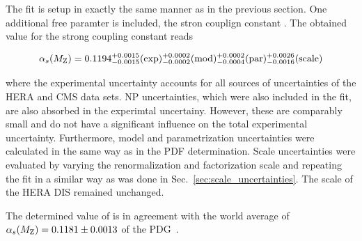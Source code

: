 The fit is setup in exactly the same manner as
in the previous section. One additional free paramter is included, the stron
couplign constant \asmz. The obtained value for the strong coupling constant
reads

\begin{equation*}
  \alpha_{s}(M_\mathrm{Z}) = 0.1194_{-0.0015}^{+0.0015}(\mathrm{exp})_{-0.0002}^{+0.0002}(\mathrm{mod})_{-0.0004}^{+0.0002}(\mathrm{par})_{-0.0016}^{+0.0026}(\mathrm{scale})
\end{equation*}

where the experimental uncertainty accounts for all sources of uncertainties of
the HERA and CMS data sets. NP uncertainties, which were also included in the
fit, are also absorbed in the experimtal uncertainy. However, these are
comparably small and do not have a significant influence on the total
experimental uncertainty. Furthermore, model and parametrization uncertainties
were calculated in the same way as in the PDF determination. Scale uncertainties
were evaluated by varying the renormalization and factorization scale and
repeating the fit in a similar way as was done in
Sec.~\ref{sec:scale_uncertainties}. The scale of the HERA DIS remained
unchanged. 


The determined value of \asmz is in agreement with the world average of
$\alpha_{s}(M_\mathrm{Z})=0.1181\pm 0.0013$ of the PDG~\cite{Agashe:2014kda}.
